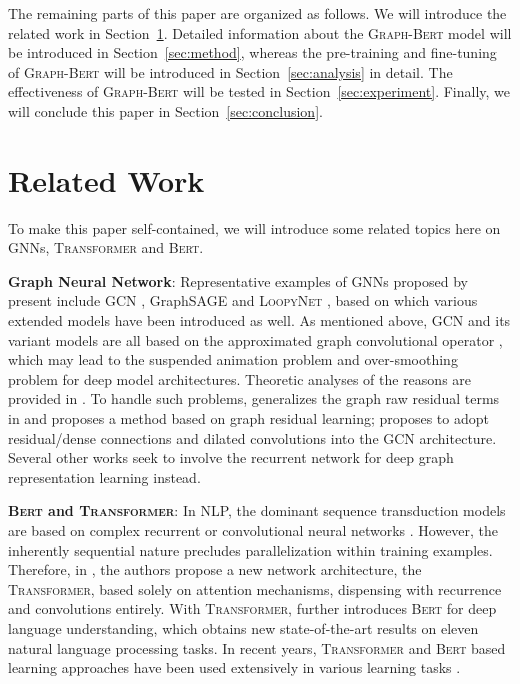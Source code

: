 \documentclass{article}
\newcommand{\our}{\textsc{Graph-Bert}}
\newcommand{\bert}{\textsc{Bert}}
\newcommand{\transformer}{\textsc{Transformer}}
\newcommand{\gcn}{\textsc{GCN}}
\newcommand{\loopy}{\textsc{LoopyNet}}
\begin{document}
The remaining parts of this paper are organized as follows. We will introduce the related work in Section~\ref{sec:related_work}. Detailed information about the {\our} model will be introduced in Section~\ref{sec:method}, whereas the pre-training and fine-tuning of {\our} will be introduced in Section~\ref{sec:analysis} in detail. The effectiveness of {\our} will be tested in Section~\ref{sec:experiment}. Finally, we will conclude this paper in Section~\ref{sec:conclusion}.

\section{Related Work}\label{sec:related_work}


To make this paper self-contained, we will introduce some related topics here on {GNNs}, {\transformer} and {\bert}.

\vspace{5pt}

\noindent \textbf{Graph Neural Network}: Representative examples of GNNs proposed by present include {\gcn} \cite{Kipf_Semi_CORR_16}, GraphSAGE \cite{Hamilton_Inductive_17} and {\loopy} \cite{loopynet}, based on which various extended models \cite{Velickovic_Graph_ICLR_18,sun2019adagcn,DBLP:journals/corr/abs-1810-05997} have been introduced as well. As mentioned above, {\gcn} and its variant models are all based on the approximated graph convolutional operator \cite{Hammond_2011}, which may lead to the suspended animation problem \cite{Zhang2019GResNetGR} and over-smoothing problem \cite{Li_Deeper_CORR_18} for deep model architectures. Theoretic analyses of the reasons are provided in \cite{Li_Deeper_CORR_18,Zhang2019GResNetGR,Merve_An_19}. To handle such problems, \cite{Zhang2019GResNetGR} generalizes the graph raw residual terms in \cite{loopynet} and proposes a method based on graph residual learning; \cite{Li_Deeper_CORR_18} proposes to adopt residual/dense connections and dilated convolutions into the GCN architecture. Several other works \cite{sun2019adagcn,Huang_Inductive_19} seek to involve the recurrent network for deep graph representation learning instead.

\vspace{5pt}

\noindent \textbf{{\bert} and {\transformer}}: In NLP, the dominant sequence transduction models are based on complex recurrent \cite{Hochreiter_Long_Neural_97,DBLP:journals/corr/ChungGCB14} or convolutional neural networks \cite{kim-2014-convolutional}. However, the inherently sequential nature precludes parallelization within training examples. Therefore, in \cite{VSPUJGKP17}, the authors propose a new network architecture, the {\transformer}, based solely on attention mechanisms, dispensing with recurrence and convolutions entirely. With {\transformer}, \cite{DCLT18} further introduces {\bert} for deep language understanding, which obtains new state-of-the-art results on eleven natural language processing tasks. In recent years, {\transformer} and {\bert} based learning approaches have been used extensively in various learning tasks \cite{DBLP:journals/corr/abs-1901-02860,lan2019albert,DBLP:journals/corr/abs-1906-00346}. 
\end{document}
